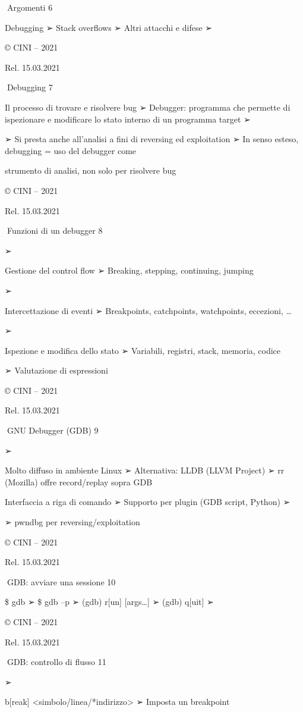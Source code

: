 \documentclass[11pt,a4paper]{article}
\begin{document}
Argomenti 6

Debugging ➢ Stack overflows ➢ Altri attacchi e difese ➢

© CINI -- 2021

Rel. 15.03.2021

Debugging 7

Il processo di trovare e risolvere bug ➢ Debugger: programma che
permette di ispezionare e modificare lo stato interno di un programma
target ➢

➢ Si presta anche all'analisi a fini di reversing ed exploitation ➢ In
senso esteso, debugging = uso del debugger come

strumento di analisi, non solo per risolvere bug

© CINI -- 2021

Rel. 15.03.2021

Funzioni di un debugger 8

➢

Gestione del control flow ➢ Breaking, stepping, continuing, jumping

➢

Intercettazione di eventi ➢ Breakpoints, catchpoints, watchpoints,
eccezioni, \ldots{}

➢

Ispezione e modifica dello stato ➢ Variabili, registri, stack, memoria,
codice

➢ Valutazione di espressioni

© CINI -- 2021

Rel. 15.03.2021

GNU Debugger (GDB) 9

➢

Molto diffuso in ambiente Linux ➢ Alternativa: LLDB (LLVM Project) ➢ rr
(Mozilla) offre record/replay sopra GDB

Interfaccia a riga di comando ➢ Supporto per plugin (GDB script, Python)
➢

➢ pwndbg per reversing/exploitation

© CINI -- 2021

Rel. 15.03.2021

GDB: avviare una sessione 10

\$ gdb ➢ \$ gdb --p ➢ (gdb) r{[}un{]} {[}args\ldots{]} ➢ (gdb)
q{[}uit{]} ➢

© CINI -- 2021

Rel. 15.03.2021

GDB: controllo di flusso 11

➢

b{[}reak{]} \textless simbolo/linea/*indirizzo\textgreater{} ➢ Imposta
un breakpoint
\end{document}
